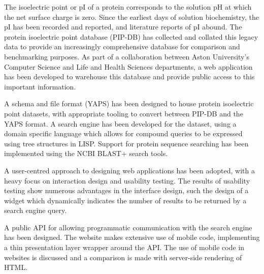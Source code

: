 \thispagestyle{plain}


\begin{center}
  \Large
  \textbf{\@title}

  \vspace{0.4cm}
  \large
  \subtitle{}

  \vspace{0.4cm}
  \@author
\end{center}



The isoelectric point or pI of a protein corresponds to the solution
pH at which the net surface charge is zero. Since the earliest days of
solution biochemistry, the pI has been recorded and reported, and
literature reports of pI abound. The protein isoelectric point
database (PIP-DB) has collected and collated this legacy data to
provide an increasingly comprehensive database for comparison and
benchmarking purposes. As part of a collaboration between Aston
University's Computer Science and Life and Health Sciences
departments, a web application has been developed to warehouse this
database and provide public access to this important information.

A schema and file format (YAPS) has been designed to house protein
isoelectric point datasets, with appropriate tooling to convert
between PIP-DB and the YAPS format. A search engine has been developed
for the dataset, using a domain specific language which allows for
compound queries to be expressed using tree structures in
LISP. Support for protein sequence searching has been implemented
using the NCBI BLAST+ search tools.

A user-centred approach to designing web applications has been
adopted, with a heavy focus on interaction design and usability
testing. The results of usability testing show numerous advantages in
the interface design, such the design of a widget which dynamically
indicates the number of results to be returned by a search engine
query.

A public API for allowing programmatic communication with the search
engine has been designed. The website makes extensive use of mobile
code, implementing a thin presentation layer wrapper around the
API. The use of mobile code in websites is discussed and a comparison
is made with server-side rendering of HTML.


